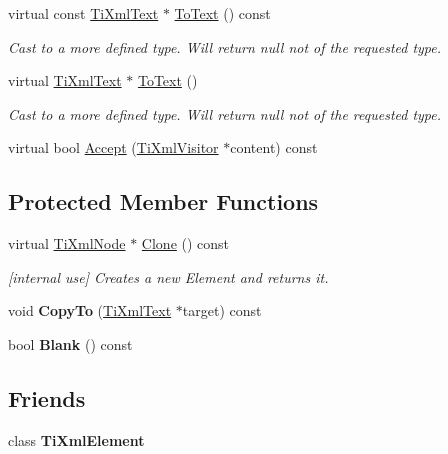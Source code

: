 \begin{DoxyCompactItemize}
virtual const \hyperlink{classTiXmlText}{Ti\+Xml\+Text} $\ast$ \hyperlink{classTiXmlText_af8973cfd4ca00c5d934cb23e8aa0f5d5}{To\+Text} () const
\begin{DoxyCompactList}\small\item\em Cast to a more defined type. Will return null not of the requested type. \end{DoxyCompactList}\item 
\mbox{\label{classTiXmlText_ae7c3a8fd3e4dbf6c0c4363a943d72f5b}} 
virtual \hyperlink{classTiXmlText}{Ti\+Xml\+Text} $\ast$ \hyperlink{classTiXmlText_ae7c3a8fd3e4dbf6c0c4363a943d72f5b}{To\+Text} ()
\begin{DoxyCompactList}\small\item\em Cast to a more defined type. Will return null not of the requested type. \end{DoxyCompactList}\item 
virtual bool \hyperlink{classTiXmlText_af65964326eac4640bfb97d4622fa0de2}{Accept} (\hyperlink{classTiXmlVisitor}{Ti\+Xml\+Visitor} $\ast$content) const
\end{DoxyCompactItemize}
\subsection*{Protected Member Functions}
\begin{DoxyCompactItemize}
\item 
\mbox{\label{classTiXmlText_a98a20d7a4f1c1478e25e34921be24bfe}} 
virtual \hyperlink{classTiXmlNode}{Ti\+Xml\+Node} $\ast$ \hyperlink{classTiXmlText_a98a20d7a4f1c1478e25e34921be24bfe}{Clone} () const
\begin{DoxyCompactList}\small\item\em \mbox{[}internal use\mbox{]} Creates a new Element and returns it. \end{DoxyCompactList}\item 
\mbox{\label{classTiXmlText_a480b8e0ad6b7833a73ecf2191195c9b5}} 
void {\bfseries Copy\+To} (\hyperlink{classTiXmlText}{Ti\+Xml\+Text} $\ast$target) const
\item 
\mbox{\label{classTiXmlText_a0fd9005b279def46859b72f336b158da}} 
bool {\bfseries Blank} () const
\end{DoxyCompactItemize}
\subsection*{Friends}
\begin{DoxyCompactItemize}
\item 
\mbox{\label{classTiXmlText_ab6592e32cb9132be517cc12a70564c4b}} 
class {\bfseries Ti\+Xml\+Element}
\end{DoxyCompactItemize}
